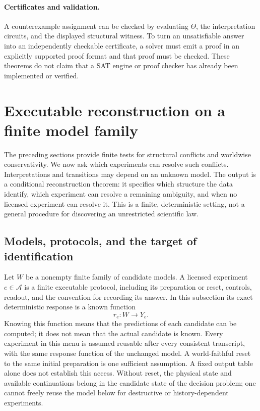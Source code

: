 \documentclass[11pt]{article}
\theoremstyle{definition}
\begin{document}
\paragraph{Certificates and validation.}
A counterexample assignment can be checked by evaluating $\Theta$, the interpretation circuits, and the displayed structural witness. To turn an unsatisfiable answer into an independently checkable certificate, a solver must emit a proof in an explicitly supported proof format and that proof must be checked. These theorems do not claim that a SAT engine or proof checker has already been implemented or verified.



\section{Executable reconstruction on a finite model family}
\label{sec:er-reconstruction}

The preceding sections provide finite tests for structural conflicts and
worldwise conservativity. We now ask which experiments can resolve such
conflicts. Interpretations and transitions may depend on an unknown model. The output is a
conditional reconstruction theorem: it specifies which structure the data
identify, which experiment can resolve a remaining ambiguity, and when no
licensed experiment can resolve it. This is a finite, deterministic setting,
not a general procedure for discovering an unrestricted scientific law.

\subsection{Models, protocols, and the target of identification}

Let $W$ be a nonempty finite family of candidate models. A licensed
experiment $e\in\mathcal A$ is a finite executable protocol, including its
preparation or reset, controls, readout, and the convention for recording
its answer. In this subsection its exact deterministic response is a known
function
\[
 r_e:W\longrightarrow Y_e.
\]
Knowing this function means that the predictions of each candidate can be
computed; it does not mean that the actual candidate is known. Every experiment in this menu is assumed reusable after every consistent
transcript, with the same response function of the unchanged model. A
world-faithful reset to the same initial preparation is one sufficient
assumption. A fixed output table alone does not establish this access.
Without reset, the physical state and available continuations belong in the
candidate state of the decision problem; one cannot freely reuse the model
below for destructive or history-dependent experiments.
\end{document}
